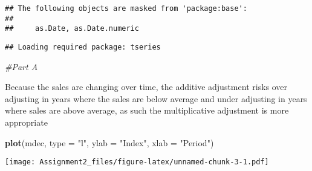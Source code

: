 \documentclass[
]{article}
\newenvironment{Shaded}{\begin{snugshade}}{\end{snugshade}}
\newcommand{\CommentTok}[1]{\textcolor[rgb]{0.56,0.35,0.01}{\textit{#1}}}
\newcommand{\DataTypeTok}[1]{\textcolor[rgb]{0.13,0.29,0.53}{#1}}
\newcommand{\DecValTok}[1]{\textcolor[rgb]{0.00,0.00,0.81}{#1}}
\newcommand{\KeywordTok}[1]{\textcolor[rgb]{0.13,0.29,0.53}{\textbf{#1}}}
\newcommand{\NormalTok}[1]{#1}
\newcommand{\OperatorTok}[1]{\textcolor[rgb]{0.81,0.36,0.00}{\textbf{#1}}}
\newcommand{\StringTok}[1]{\textcolor[rgb]{0.31,0.60,0.02}{#1}}
\begin{document}
\begin{verbatim}
## The following objects are masked from 'package:base':
## 
##     as.Date, as.Date.numeric
\end{verbatim}

\begin{verbatim}
## Loading required package: tseries
\end{verbatim}

\begin{Shaded}
\begin{Highlighting}[]
\CommentTok{#Part A}
\end{Highlighting}
\end{Shaded}

\begin{Shaded}
\end{Shaded}

Because the sales are changing over time, the additive adjustment risks
over adjusting in years where the sales are below average and under
adjusting in years where sales are above average, as such the
multiplicative adjustment is more appropriate

\begin{Shaded}
\begin{Highlighting}[]
\KeywordTok{plot}\NormalTok{(mdec, }\DataTypeTok{type =} \StringTok{"l"}\NormalTok{, }\DataTypeTok{ylab =} \StringTok{"Index"}\NormalTok{, }\DataTypeTok{xlab =} \StringTok{"Period"}\NormalTok{)}
\end{Highlighting}
\end{Shaded}

\texttt{[image: Assignment2\_files/figure-latex/unnamed-chunk-3-1.pdf]}
\end{document}
